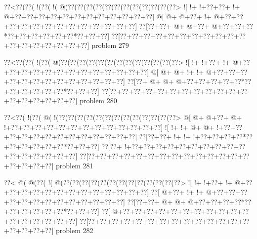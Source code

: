 \vbox{\vbox{\goo
\0??<\0??(\0??(\- !(\0??(\- !(\- @(\0??(\0??(\0??(\0??(\0??(\0??(\0??(\0??(\0??(\0??(\0??(\0??>
\- ![\- !+\- !+\0??+\0??+\- !+\- @+\0??+\0??+\0??+\0??+\0??+\0??+\0??+\0??+\0??+\0??+\0??+\0??]
\- @[\- @+\- @+\0??+\- !+\- @+\0??+\0??+\0??+\0??+\0??+\0??+\0??+\0??+\0??+\0??+\0??+\0??+\0??]
\0??[\0??+\0??+\- @+\- @+\0??+\- @+\0??+\0??+\0??*\0??+\0??+\0??+\0??+\0??+\0??*\0??+\0??+\0??]
\0??[\0??+\0??+\0??+\0??+\0??+\0??+\0??+\0??+\0??+\0??+\0??+\0??+\0??+\0??+\0??+\0??+\0??+\0??]
}
\hfil problem 279\hfil\break
}



\vbox{\vbox{\goo
\0??<\0??(\0??(\- !(\0??(\- @(\0??(\0??(\0??(\0??(\0??(\0??(\0??(\0??(\0??(\0??(\0??(\0??(\0??>
\- ![\- !+\- !+\0??+\- !+\- @+\0??+\0??+\0??+\0??+\0??+\0??+\0??+\0??+\0??+\0??+\0??+\0??+\0??]
\- @[\- @+\- @+\- !+\- !+\- @+\0??+\0??+\0??+\0??+\0??+\0??+\0??+\0??+\0??+\0??+\0??+\0??+\0??]
\0??[\0??+\- @+\- @+\- @+\0??+\0??+\0??+\0??+\0??*\0??+\0??+\0??+\0??+\0??+\0??*\0??+\0??+\0??]
\0??[\0??+\0??+\0??+\0??+\0??+\0??+\0??+\0??+\0??+\0??+\0??+\0??+\0??+\0??+\0??+\0??+\0??+\0??]
}
\hfil problem 280\hfil\break
}



\vbox{\vbox{\goo
\0??<\0??(\- !(\0??(\- @(\- !(\0??(\0??(\0??(\0??(\0??(\0??(\0??(\0??(\0??(\0??(\0??(\0??(\0??>
\- @[\- @+\- @+\0??+\- @+\- !+\0??+\0??+\0??+\0??+\0??+\0??+\0??+\0??+\0??+\0??+\0??+\0??+\0??]
\- ![\- !+\- !+\- @+\- @+\- !+\0??+\0??+\0??+\0??+\0??+\0??+\0??+\0??+\0??+\0??+\0??+\0??+\0??]
\0??[\0??+\0??+\- !+\- !+\- !+\0??+\0??+\0??+\0??*\0??+\0??+\0??+\0??+\0??+\0??*\0??+\0??+\0??]
\0??[\0??+\- !+\0??+\0??+\0??+\0??+\0??+\0??+\0??+\0??+\0??+\0??+\0??+\0??+\0??+\0??+\0??+\0??]
\0??[\0??+\0??+\0??+\0??+\0??+\0??+\0??+\0??+\0??+\0??+\0??+\0??+\0??+\0??+\0??+\0??+\0??+\0??]
}
\hfil problem 281\hfil\break
}



\vbox{\vbox{\goo
\0??<\- @(\- @(\0??(\- !(\- @(\0??(\0??(\0??(\0??(\0??(\0??(\0??(\0??(\0??(\0??(\0??(\0??(\0??>
\- ![\- !+\- !+\0??+\- !+\- @+\0??+\0??+\0??+\0??+\0??+\0??+\0??+\0??+\0??+\0??+\0??+\0??+\0??]
\0??[\- @+\0??+\- !+\- !+\- @+\0??+\0??+\0??+\0??+\0??+\0??+\0??+\0??+\0??+\0??+\0??+\0??+\0??]
\0??[\0??+\0??+\- @+\- @+\- @+\0??+\0??+\0??+\0??*\0??+\0??+\0??+\0??+\0??+\0??*\0??+\0??+\0??]
\0??[\- @+\0??+\0??+\0??+\0??+\0??+\0??+\0??+\0??+\0??+\0??+\0??+\0??+\0??+\0??+\0??+\0??+\0??]
\0??[\0??+\0??+\0??+\0??+\0??+\0??+\0??+\0??+\0??+\0??+\0??+\0??+\0??+\0??+\0??+\0??+\0??+\0??]
}
\hfil problem 282\hfil\break
}



